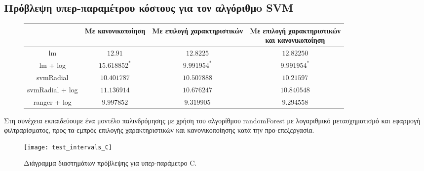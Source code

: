 \subsection{Πρόβλεψη υπερ-παραμέτρου κόστους για τον αλγόριθμo \gls{SVM} }
\begin{figure}[!htb]
	\footnotesize
	\begin{center}
		\begin{tabular}{ |c|c|c|c| } 
			\hline
			& Με κανονικοποίηση & Με επιλογή χαρακτηριστικών & \pbox{20cm}{Με επιλογή χαρακτηριστικών\\ και κανονικοποίηση} \\
			\hline
			lm & $12.91$  & $12.8225$ & $12.82250$  \\
			\hline
			lm + log & $15.618852^*$ & $9.991954 ^{*}$& $9.991954^*$ \\
			\hline
			svmRadial & $10.401787$ &$10.507888$& $10.21597$\\
			\hline
			svmRadial + log& $11.136914$ & $10.676247$& $10.840548$\\
			\hline
			ranger + log  & $9.997852$ & $9.319905$ & $9.294558$\\
			\hline
		\end{tabular}   
	\end{center}
\end{figure}

Στη συνέχεια εκπαιδεύουμε ένα μοντέλο παλινδρόμησης με χρήση του αλγορίθμου randomForest με λογαριθμικό μετασχηματισμό και εφαρμογή φιλτραρίσματος, προς-τα-εμπρός επιλογής χαρακτηριστικών και κανονικοποίησης κατά την προ-επεξεργασία.

\begin{figure} [!htb]
	\texttt{[image: test\_intervals\_C]}
		\caption[Διάγραμμα διαστημάτων πρόβλεψης για υπερ-παράμετρο decay]{Διάγραμμα διαστημάτων πρόβλεψης για υπερ-παράμετρο C.}
	\label{fig:high} 
\end{figure}
\FloatBarrier
